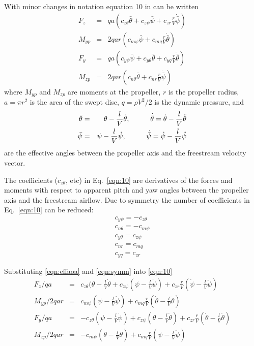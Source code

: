 \documentclass[11pt,openany,twoside]{book}
\numberwithin{equation}{section}		%
\newcommand{\Eqn}[1]{Eq.\ \ref{#1}}  %
\begin{document}
With minor changes in notation
equation 10 in \cite{reed1961analytical} can be written
\begin{eqnarray}
\label{eqn:10}
F_z &=& qa(c_{z\theta}\bar{\theta} + c_{z\psi}\bar{\psi} + c_{zr}\frac{r}{V}\dot{\bar{\psi}}) \nonumber \\
M_{yp} &=& 2qar(c_{m\psi}\bar{\psi} + c_{mq}\frac{r}{V}\dot{\bar{\theta}}) \nonumber \\
F_y &=& qa(c_{y\psi}\bar{\psi} + c_{y\theta}\bar{\theta} + c_{yq}\frac{r}{V}\dot{\bar{\theta}}) \nonumber \\
M_{zp} &=& 2qar(c_{n\theta}\bar{\theta} + c_{nr}\frac{r}{V}\dot{\bar{\psi}})
\end{eqnarray}
where $M_{yp}$ and $M_{zp}$ are moments at the propeller,
$r$ is the propeller radius, $a = \pi r^2$ is the area of the swept disc,
$q = \rho V^2/2$ is the dynamic pressure, and
\begin{eqnarray}
\label{eqn:effaoa}
\bar{\theta} &=& \theta - \frac{l}{V}\dot{\theta},\hspace{10mm}
	\dot{\bar{\theta}} = \dot{\theta} - \frac{l}{V}\ddot{\theta} \nonumber \\
\bar{\psi} &=& \psi - \frac{l}{V}\dot{\psi}, \hspace{10mm}
	\dot{\bar{\psi}} = \dot{\psi} - \frac{l}{V}\ddot{\psi}
\end{eqnarray}
are the effective angles between the propeller axis and the freestream velocity vector.

The coefficients ($c_{z\theta}$, etc) in \Eqn{eqn:10} are derivatives of the
forces and moments with respect to apparent pitch and yaw angles between the
propeller axis and the freestream airflow.
Due to symmetry the number of coefficients in \Eqn{eqn:10} can be reduced:
\begin{eqnarray}
\label{eqn:symm}
c_{y\psi} = -c_{z\theta} \nonumber \\
c_{n\theta} = -c_{m\psi} \nonumber \\
c_{y\theta} = c_{z\psi} \nonumber \\
c_{nr} = c_{mq} \nonumber \\
c_{yq} = c_{zr}
\end{eqnarray}

Substituting \ref{eqn:effaoa} and \ref{eqn:symm} into \ref{eqn:10}
\begin{eqnarray}
\label{eqn:10a}
F_z/qa &=& c_{z\theta}(\theta - \frac{l}{V}\dot{\theta} + c_{z\psi}(\psi - \frac{l}{V}\dot{\psi}) + c_{zr}\frac{r}{V}(\dot{\psi} - \frac{l}{V}\ddot{\psi}) \nonumber \\
M_{yp}/2qar &=& c_{m\psi}(\psi - \frac{l}{V}\dot{\psi}) + c_{mq}\frac{r}{V}(\dot{\theta} - \frac{l}{V}\ddot{\theta}) \nonumber \\
F_y/qa &=& -c_{z\theta}(\psi - \frac{l}{V}\dot{\psi}) + c_{z\psi}(\theta - \frac{l}{V}\dot{\theta}) + c_{zr}\frac{r}{V}(\dot{\theta} - \frac{l}{V}\ddot{\theta}) \nonumber \\
M_{zp}/2qar &=& -c_{m\psi}(\theta - \frac{l}{V}\dot{\theta}) + c_{mq}\frac{r}{V}(\dot{\psi} - \frac{l}{V}\ddot{\psi})
\end{eqnarray}
\end{document}
